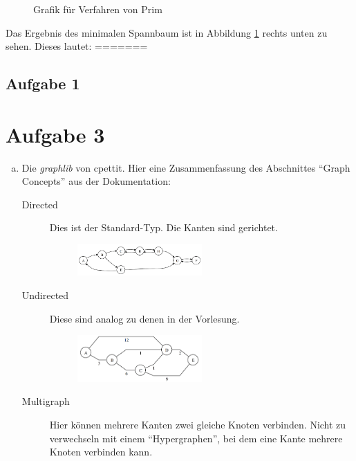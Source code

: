 \documentclass[11pt]{article}
\begin{document}
\begin{enumerate}[a)]
\begin{figure}[h!]
	\caption{Grafik für Verfahren von Prim}
	\label{fig:a2}
\end{figure}
Das Ergebnis des minimalen Spannbaum ist in Abbildung \ref{fig:a2} rechts unten
zu sehen. Dieses lautet:
=======
\subsection*{Aufgabe 1}
  


  \newpage
\section*{Aufgabe 3}
\begin{enumerate}[a)]

  \item Die \emph{graphlib} von cpettit. Hier eine Zusammenfassung des
    Abschnittes ``Graph Concepts'' aus der Dokumentation:
    \begin{description}
      \item[Directed] 
        Dies ist der Standard-Typ. Die Kanten sind gerichtet.

        \begin{figure}[h!]
          \centering
          \includegraphics[width=0.5\textwidth]{./tarjan.png}
          \label{fig:}
        \end{figure}

      \item[Undirected]
        Diese sind analog zu denen in der Vorlesung.

        \begin{figure}[h!]
          \centering
          \includegraphics[width=0.5\textwidth]{prim-input.png}
          \label{fig:input}
        \end{figure}

      \item[Multigraph]
        Hier k\"onnen mehrere Kanten zwei gleiche Knoten verbinden. Nicht
        zu verwechseln mit einem ``Hypergraphen'', bei dem eine Kante mehrere
        Knoten verbinden kann.


\end{description}
\end{enumerate}
\end{enumerate}
\end{document}
